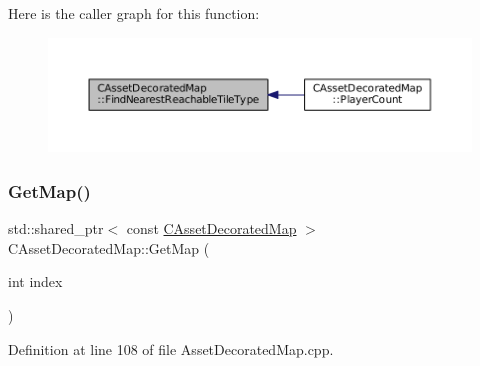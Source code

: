 Here is the caller graph for this function\+:
\nopagebreak
\begin{figure}[H]
\begin{center}
\leavevmode
\includegraphics[width=350pt]{classCAssetDecoratedMap_a9e9eed95b427443d196b56b852cdeb9d_icgraph}
\end{center}
\end{figure}
\hypertarget{classCAssetDecoratedMap_afafb067884070fe0340f8b7e63bdc099}{}\label{classCAssetDecoratedMap_afafb067884070fe0340f8b7e63bdc099} 
\subsubsection{\texorpdfstring{Get\+Map()}{GetMap()}}
{\footnotesize\ttfamily std\+::shared\+\_\+ptr$<$ const \hyperlink{classCAssetDecoratedMap}{C\+Asset\+Decorated\+Map} $>$ C\+Asset\+Decorated\+Map\+::\+Get\+Map (\begin{DoxyParamCaption}\item[{int}]{index }\end{DoxyParamCaption})\hspace{0.3cm}{\ttfamily [static]}}



Definition at line 108 of file Asset\+Decorated\+Map.\+cpp.


